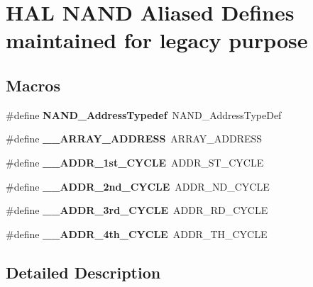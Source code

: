 \hypertarget{group___h_a_l___n_a_n_d___aliased___defines}{}\section{H\+AL N\+A\+ND Aliased Defines maintained for legacy purpose}
\label{group___h_a_l___n_a_n_d___aliased___defines}
\subsection*{Macros}
\begin{DoxyCompactItemize}
\item 
\#define {\bfseries N\+A\+N\+D\+\_\+\+Address\+Typedef}~N\+A\+N\+D\+\_\+\+Address\+Type\+Def\hypertarget{group___h_a_l___n_a_n_d___aliased___defines_gab3708b27e7380fc5270b5196b71b93aa}{}\label{group___h_a_l___n_a_n_d___aliased___defines_gab3708b27e7380fc5270b5196b71b93aa}

\item 
\#define {\bfseries \+\_\+\+\_\+\+A\+R\+R\+A\+Y\+\_\+\+A\+D\+D\+R\+E\+SS}~A\+R\+R\+A\+Y\+\_\+\+A\+D\+D\+R\+E\+SS\hypertarget{group___h_a_l___n_a_n_d___aliased___defines_gaeaae78138cfccceb8668c896eb8fb634}{}\label{group___h_a_l___n_a_n_d___aliased___defines_gaeaae78138cfccceb8668c896eb8fb634}

\item 
\#define {\bfseries \+\_\+\+\_\+\+A\+D\+D\+R\+\_\+1st\+\_\+\+C\+Y\+C\+LE}~A\+D\+D\+R\+\_\+S\+T\+\_\+\+C\+Y\+C\+LE\hypertarget{group___h_a_l___n_a_n_d___aliased___defines_ga1e95b9f6b605085f2b0ad95794841a7b}{}\label{group___h_a_l___n_a_n_d___aliased___defines_ga1e95b9f6b605085f2b0ad95794841a7b}

\item 
\#define {\bfseries \+\_\+\+\_\+\+A\+D\+D\+R\+\_\+2nd\+\_\+\+C\+Y\+C\+LE}~A\+D\+D\+R\+\_\+N\+D\+\_\+\+C\+Y\+C\+LE\hypertarget{group___h_a_l___n_a_n_d___aliased___defines_gaa1477fe89e780f7da3e780d29a97a9b1}{}\label{group___h_a_l___n_a_n_d___aliased___defines_gaa1477fe89e780f7da3e780d29a97a9b1}

\item 
\#define {\bfseries \+\_\+\+\_\+\+A\+D\+D\+R\+\_\+3rd\+\_\+\+C\+Y\+C\+LE}~A\+D\+D\+R\+\_\+R\+D\+\_\+\+C\+Y\+C\+LE\hypertarget{group___h_a_l___n_a_n_d___aliased___defines_ga4316e40c7905baa397537633d191fa31}{}\label{group___h_a_l___n_a_n_d___aliased___defines_ga4316e40c7905baa397537633d191fa31}

\item 
\#define {\bfseries \+\_\+\+\_\+\+A\+D\+D\+R\+\_\+4th\+\_\+\+C\+Y\+C\+LE}~A\+D\+D\+R\+\_\+T\+H\+\_\+\+C\+Y\+C\+LE\hypertarget{group___h_a_l___n_a_n_d___aliased___defines_ga012bb903469430b21f4bbca8ce3c7654}{}\label{group___h_a_l___n_a_n_d___aliased___defines_ga012bb903469430b21f4bbca8ce3c7654}

\end{DoxyCompactItemize}


\subsection{Detailed Description}
